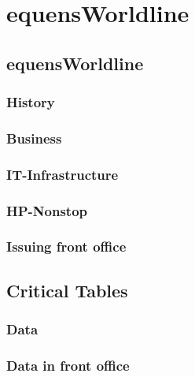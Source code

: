 
\chapter*{equensWorldline}
\label{ch:equensWorldline}
\section{equensWorldline}
\subsection{History}
\subsection{Business}
\subsection{IT-Infrastructure}
\subsection{HP-Nonstop}
\subsection{Issuing front office}

\section{Critical Tables}
\subsection{Data}
\subsection{Data in front office}